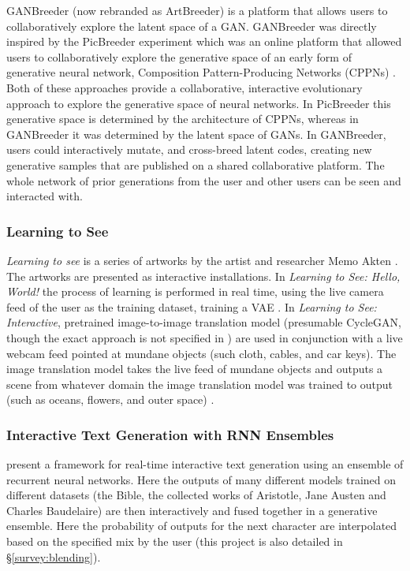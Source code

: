 GANBreeder (now rebranded as ArtBreeder) \citep{simon2020artbreeder} is a platform that allows users to collaboratively explore the latent space of a GAN.
GANBreeder was directly inspired by the PicBreeder experiment \citep{secretan2008picbreeder,secretan2011picbreeder} which was an online platform that allowed users to collaboratively explore the generative space of an early form of generative neural network, Composition Pattern-Producing Networks (CPPNs) \citep{stanley2007compositional}.
Both of these approaches provide a collaborative, interactive evolutionary approach to explore the generative space of neural networks. 
In PicBreeder this generative space is determined by the architecture of CPPNs, whereas in GANBreeder it was determined by the latent space of GANs.
In GANBreeder, users could interactively mutate, and cross-breed latent codes, creating new generative samples that are published on a shared collaborative platform.
The whole network of prior generations from the user and other users can be seen and interacted with.

\subsubsection{Learning to See}

\textit{Learning to see} is a series of artworks by the artist and researcher Memo Akten \citep{akten2019learning, celis2021memo}.
The artworks are presented as interactive installations.
In \textit{Learning to See: Hello, World!} the process of learning is performed in real time, using the live camera feed of the user as the training dataset, training a VAE \citep{akten2017hello}.
In \textit{Learning to See: Interactive}, pretrained image-to-image translation model (presumable CycleGAN, though the exact approach is not specified in \citep{akten2019learning}) are used in conjunction with a live webcam feed pointed at mundane objects (such cloth, cables, and car keys).
The image translation model takes the live feed of mundane objects and outputs a scene from whatever domain the image translation model was trained to output (such as oceans, flowers, and outer space) \citep{akten2017interactive}.

\subsubsection{Interactive Text Generation with RNN Ensembles}

\cite{akten2016real} present a framework for real-time interactive text generation using an ensemble of recurrent neural networks. 
Here the outputs of many different models trained on different datasets (the Bible, the collected works of Aristotle, Jane Austen and Charles Baudelaire) are then interactively and fused together in a generative ensemble.
Here the probability of outputs for the next character are interpolated based on the specified mix by the user (this project is also detailed in \S \ref{survey:blending}).

